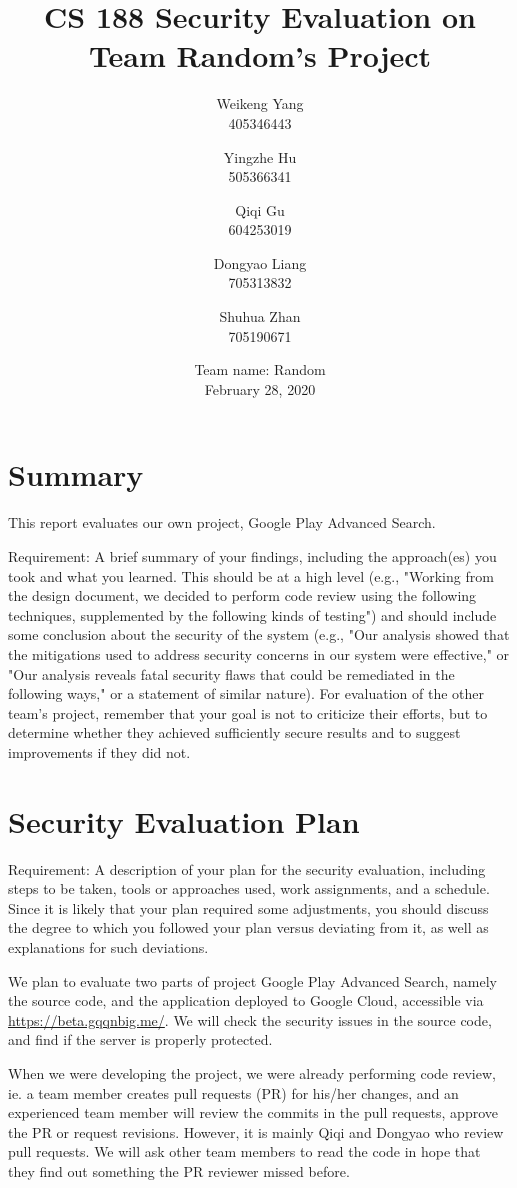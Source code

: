 \documentclass[12pt, a4paper]{article}
\title{CS 188 Security Evaluation on Team Random's Project}
\author{Weikeng Yang\\405346443 \and
Yingzhe Hu\\505366341 \and
Qiqi Gu\\604253019 \and
Dongyao Liang\\705313832 \and
Shuhua Zhan\\705190671}
\date{Team name: Random\\[2mm]February 28, 2020}
\begin{document}
\maketitle

\tableofcontents

\section{Summary}

This report evaluates our own project, Google Play Advanced Search.

Requirement: A brief summary of your findings, including the approach(es) you took and what you learned. This should be at a high level (e.g., "Working from the design document, we decided to perform code review using the following techniques, supplemented by the following kinds of testing") and should include some conclusion about the security of the system (e.g., "Our analysis showed that the mitigations used to address security concerns in our system were effective," or "Our analysis reveals fatal security flaws that could be remediated in the following ways," or a statement of similar nature).   For evaluation of the other team’s project, remember that your goal is not to criticize their efforts, but to determine whether they achieved sufficiently secure results and to suggest improvements if they did not. 

\section{Security Evaluation Plan}

Requirement: A description of your plan for the security evaluation, including steps to be taken, tools or approaches used, work assignments, and a schedule. Since it is likely that your plan required some adjustments, you should discuss the degree to which you followed your plan versus deviating from it, as well as explanations for such deviations.  

We plan to evaluate two parts of project Google Play Advanced Search, namely the source code, and the application deployed to Google Cloud, accessible via \url{https://beta.gqqnbig.me/}. We will check the security issues in the source code, and find if the server is properly protected.

When we were developing the project, we were already performing code review, ie. a team member creates pull requests (PR) for his/her changes, and an experienced team member will review the commits in the pull requests, approve the PR or request revisions. However, it is mainly Qiqi and Dongyao who review pull requests. We will ask other team members to read the code in hope that they find out something the PR reviewer missed before.
\end{document}
